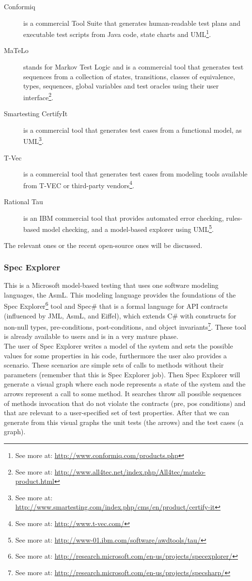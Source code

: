 \begin{description}
\item[Conformiq] is a commercial Tool Suite that generates
human-readable test plans and executable test scripts from Java code, state charts and \ac{UML}\footnote{See more at: \url{http://www.conformiq.com/products.php}}.
\item[MaTeLo] stands for Markov Test Logic and is a commercial tool
that generates test sequences from a collection of states, transitions, classes of equivalence, types, sequences, global variables and test oracles
using their user interface\footnote{See more at: \url{http://www.all4tec.net/index.php/All4tec/matelo-product.html}}.
\item[Smartesting CertifyIt] is a commercial tool that generates test cases from a functional model, as \ac{UML}\footnote{See more at: \url{http://www.smartesting.com/index.php/cms/en/product/certify-it}}.
\item[T-Vec] is a commercial tool that generates test cases from modeling tools available from T-VEC or third-party vendors\footnote{See more at: \url{http://www.t-vec.com/}}.
\item[Rational Tau] is an \ac{IBM} commercial tool that provides automated error checking, rules-based model checking, and a model-based explorer using
\ac{UML}\footnote{See more at: \url{http://www-01.ibm.com/software/awdtools/tau/}}.
\end{description}
The relevant ones or the recent open-source ones will be discussed.

\subsubsection{Spec Explorer}
This is a Microsoft model-based testing that uses one software modeling languages, the \ac{AsmL}.
This modeling language provides the foundations of the Spec Explorer\footnote{See more at: \url{http://research.microsoft.com/en-us/projects/specexplorer/}} tool
and Spec\# that is a formal language for \ac{API} contracts (influenced by \ac{JML}, \ac{AsmL}, and Eiffel), which extends C\# with constructs for non-null types,
pre-conditions, post-conditions, and object invariants\footnote{See more at: \url{http://research.microsoft.com/en-us/projects/specsharp/}}.
These tool is already available to users and is in a very mature phase.\\
\indent The user of Spec Explorer writes a model of the system and sets the possible values for some properties in his code, furthermore the user also provides a scenario.
These scenarios are simple sets of calls to methods without their parameters (remember that this is Spec Explorer job).
Then Spec Explorer will generate a visual graph where each node represents a state of the system and the arrows represent a call to some method.
It searches throw all possible sequences of methods invocation that do not violate the contracts (pre, pos conditions) and
that are relevant to a user-specified set of test properties. After that we can generate from this visual graphs the unit tests (the arrows) and the
test cases (a graph).

